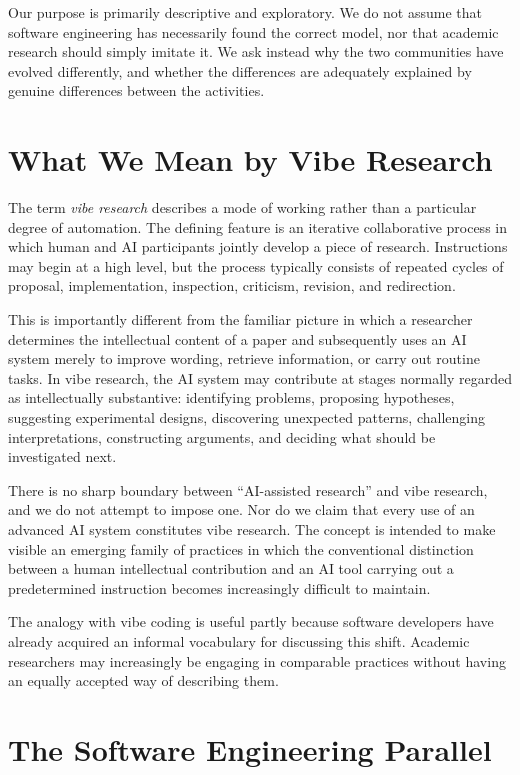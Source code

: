 Our purpose is primarily descriptive and exploratory. We do not assume that software engineering has necessarily found the correct model, nor that academic research should simply imitate it. We ask instead why the two communities have evolved differently, and whether the differences are adequately explained by genuine differences between the activities.


\section{What We Mean by Vibe Research}

The term \emph{vibe research} describes a mode of working rather than a particular degree of automation. The defining feature is an iterative collaborative process in which human and AI participants jointly develop a piece of research. Instructions may begin at a high level, but the process typically consists of repeated cycles of proposal, implementation, inspection, criticism, revision, and redirection.

This is importantly different from the familiar picture in which a researcher determines the intellectual content of a paper and subsequently uses an AI system merely to improve wording, retrieve information, or carry out routine tasks. In vibe research, the AI system may contribute at stages normally regarded as intellectually substantive: identifying problems, proposing hypotheses, suggesting experimental designs, discovering unexpected patterns, challenging interpretations, constructing arguments, and deciding what should be investigated next.

There is no sharp boundary between ``AI-assisted research'' and vibe research, and we do not attempt to impose one. Nor do we claim that every use of an advanced AI system constitutes vibe research. The concept is intended to make visible an emerging family of practices in which the conventional distinction between a human intellectual contribution and an AI tool carrying out a predetermined instruction becomes increasingly difficult to maintain.

The analogy with vibe coding is useful partly because software developers have already acquired an informal vocabulary for discussing this shift. Academic researchers may increasingly be engaging in comparable practices without having an equally accepted way of describing them.


\section{The Software Engineering Parallel}

